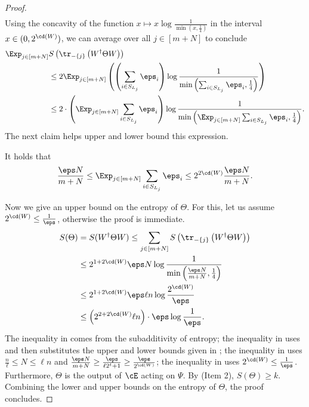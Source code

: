 \documentclass{toc}
\begin{document}
\begin{proof}
\begin{align}
\end{align}
Using the concavity of the function $x \mapsto x\log\frac{1}{\min\left(x,\frac{1}{4}\right)}$ in the interval $x\in (0, 2^{\cd(W)})$, we can average over all $j\in [m+N]$ to conclude
\begin{align}
    \Exp_{j\in [m+N]}&S \left( \tr_{-\{j\}} \left(W^\dagger \Theta W\right) \right) \\
    &\leq  2\Exp_{j\in [m+N]}\left(\left(\sum_{i\in S_{L_j}}\eps_i\right)\log \frac{1}{\min\left(\sum_{i\in S_{L_j}}\eps_i, \frac{1}{4}\right)}\right)\label{eq:totent} \\
    &\leq 2\cdot \left(\Exp_{j\in [m+N]}\sum_{i\in S_{L_j}}\eps_i\right)\log \frac{1}{\min\left(\Exp_{j\in [m+N]}\sum_{i\in S_{L_j}}\eps_i, \frac{1}{4}\right)}. 
\end{align}
The next claim helps upper and lower bound this expression.
\begin{claim}
\label{clm:mostlow}
It holds that 
\begin{align}
\frac{\eps N}{m+N}\leq \Exp_{j\in [m+N]}\sum_{i\in S_{L_j}}\eps_i\leq 2^{2\cd(W)}\frac{\eps N}{m+N}.
\end{align}
\end{claim}
%
Now we give an upper bound on
the entropy of $\Theta$. For this, let us assume $2^{\cd(W)}\leq \frac{1}{\eps}$, 
%
otherwise  %
the proof is immediate. 
\begin{align}
S(\Theta) &= S(W^\dagger \Theta W)\leq \sum_{j \in [m+N]} S\left( \tr_{-\{j\}}\left(W^\dagger \Theta W \right) \right) \label{eq:entropysum-1} \\
&\leq 2^{1+2\cd(W)}\eps N \log \frac{1}{\min\left(\frac{\eps N}{m+N}, \frac{1}{4}\right)} \label{eq:entropysum-2} \\
&\leq
2^{1+2\cd(W)}\eps \ell n \log \frac{2^{\cd(W)}}{\eps} \label{eq:entropysum-3} \\
&\leq \left(2^{2+2\cd(W)}\ell n \right) \cdot \eps \log \frac{1}{\eps}. \label{eq:entropysum-4}
\end{align}
The inequality in  comes from the subadditivity of entropy; the inequality in  uses  and then substitutes the upper and lower bounds given in ; the inequality in  uses $ \frac{n}{\ell}\leq N\leq \ell n$ and $\frac{\eps N}{m+N}\geq \frac{\eps}{ \ell 2^{t}+1}\geq  \frac{\eps}{ 2^{\cd(W)}}$; the inequality in  uses $2^{\cd(W)}\leq \frac{1}{\eps}$. Furthermore, $\Theta$ is the output of $\cE$ acting on $\Psi$. By  (Item 2), $S(\Theta) \geq k$. Combining the lower and upper bounds on the entropy of $\Theta$, the proof concludes. 
\end{proof}
\end{document}
